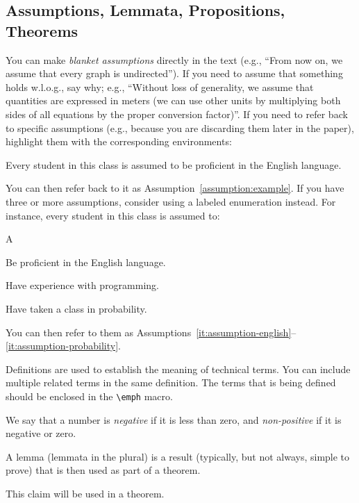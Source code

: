 \documentclass[letterpaper, 10 pt, conference]{ieeeconf}
\begin{document}
\subsection{Assumptions, Lemmata, Propositions, Theorems}
You can make \emph{blanket assumptions} directly in the text (e.g., ``From now on, we assume that every graph is undirected''). If you need to assume that something holds w.l.o.g., say why; e.g., ``Without loss of generality, we assume that quantities are expressed in meters (we can use other units by multiplying both sides of all equations by the proper conversion factor)''.
If you need to refer back to specific assumptions (e.g., because you are discarding them later in the paper), highlight them with the corresponding environments:
\begin{assumption}\label{assumption:example}
  Every student in this class is assumed to be proficient in the English language.
\end{assumption}
You can then refer back to it as Assumption~\ref{assumption:example}.
If you have three or more assumptions, consider using a labeled enumeration instead. For instance, every student in this class is assumed to: 

\begin{lenumerate}{A}
\item \label{it:assumption-english} Be proficient in the English language.
\item Have experience with programming.
\item \label{it:assumption-probability} Have taken a class in probability.
\end{lenumerate}
You can then refer to them as Assumptions~\ref{it:assumption-english}--\ref{it:assumption-probability}.

Definitions are used to establish the meaning of technical terms. You can include multiple related terms in the same definition. The terms that is being defined should be enclosed in the \verb|\emph| macro.
\begin{definition}
  We say that a number is \emph{negative} if it is less than zero, and \emph{non-positive} if it is negative or zero.
\end{definition}

A lemma (lemmata in the plural) is a result (typically, but not always, simple to prove) that is then used as part of a theorem.
\begin{lemma}
  This claim will be used in a theorem.
\end{lemma}
\end{document}
